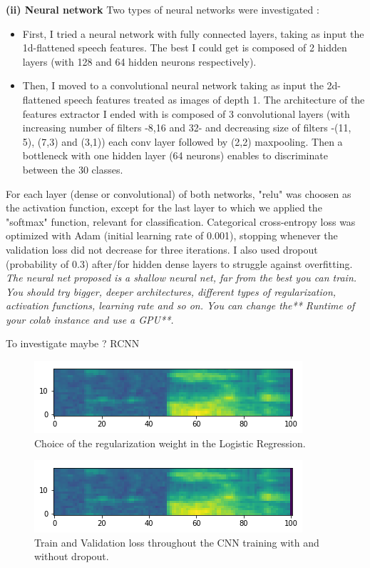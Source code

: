 \documentclass[11pt]{article}
\begin{document}
\textbf{(ii) Neural network} Two types of neural networks were investigated : 

\begin{itemize}
\item First, I tried a neural network with fully connected layers, taking as input the 1d-flattened speech features. The best I could get is composed of 2 hidden layers (with 128 and 64 hidden neurons respectively). 
\item Then, I moved to a convolutional neural network taking as input the 2d-flattened speech features treated as images of depth 1. The architecture of the features extractor I ended with is composed of 3 convolutional layers (with increasing number of filters -8,16 and 32- and decreasing size of filters -(11, 5), (7,3) and (3,1)) each conv layer followed by (2,2) maxpooling. Then a bottleneck with one hidden layer (64 neurons) enables to discriminate between the 30 classes.
\end{itemize}
For each layer (dense or convolutional) of both networks, "relu" was choosen as the activation function, except for the last layer to which we applied the "softmax" function, relevant for classification. Categorical cross-entropy loss was optimized with Adam (initial learning rate of 0.001), stopping whenever the validation loss did not decrease for three iterations. I also used dropout (probability of 0.3) after/for hidden dense layers to struggle against overfitting.
\textit{The neural net proposed is a shallow neural net, far from the best you can train. You should try bigger, deeper architectures, different types of regularization, activation functions, learning rate and so on. You can change the** Runtime of your colab instance and use a GPU**.}

To investigate maybe ? RCNN

\begin{figure}[h!]
\begin{center}
\includegraphics[scale=0.5]{i.png}
\caption{Choice of the regularization weight in the Logistic Regression.}
\end{center}
\end{figure}

\begin{figure}[h!]
\begin{center}
\includegraphics[scale=0.5]{i.png}
\caption{Train and Validation loss throughout the CNN training with and without dropout.}
\end{center}
\end{figure}
\end{document}
